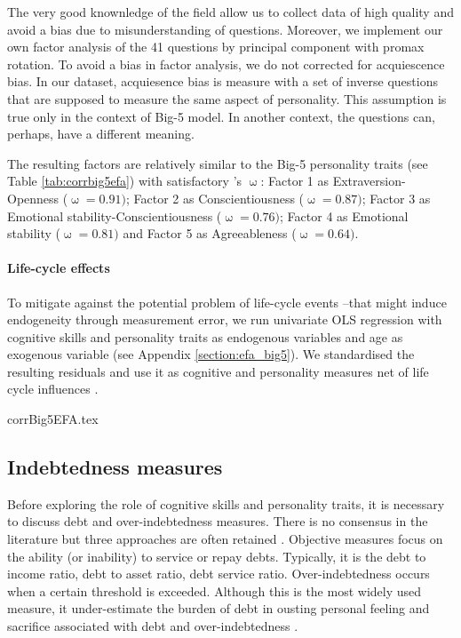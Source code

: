 \documentclass[a4paper, 11pt, onecolumn]{article}
\begin{document}
The very good knownledge of the field allow us to collect data of high quality and avoid a bias due to misunderstanding of questions.
Moreover, we implement our own factor analysis of the 41 questions by principal component with promax rotation.
To avoid a bias in factor analysis, we do not corrected for acquiescence bias.
In our dataset, acquiesence bias is measure with a set of inverse questions that are supposed to measure the same aspect of personality. 
This assumption is true only in the context of Big-5 model. 
In another context, the questions can, perhaps, have a different meaning.

The resulting factors are relatively similar to the Big-5 personality traits (see Table \ref{tab:corrbig5efa}) with satisfactory \citeauthor{McDonald1999}'s $\upomega$: Factor 1 as Extraversion-Openness ($\upomega=0.91)$; Factor 2 as Conscientiousness ($\upomega=0.87)$; Factor 3 as Emotional stability-Conscientiousness ($\upomega=0.76)$; Factor 4 as Emotional stability ($\upomega=0.81)$ and Factor 5 as Agreeableness ($\upomega=0.64)$.

\paragraph{Life-cycle effects}
To mitigate against the potential problem of life-cycle events --that might induce endogeneity through measurement error, we run univariate OLS regression with cognitive skills and personality traits as endogenous variables and age as exogenous variable (see Appendix \ref{section:efa_big5}).
We standardised the resulting residuals and use it as cognitive and personality measures net of life cycle influences \citep{Nyhus2005, Brown2014}. 



{corrBig5EFA.tex}



	\subsection{Indebtedness measures}

Before exploring the role of cognitive skills and personality traits, it is necessary to discuss debt and over-indebtedness measures.
There is no consensus in the literature but three approaches are often retained \citep{Betti2007, Ferreira2000}.
Objective measures focus on the ability (or inability) to service or repay debts.
Typically, it is the debt to income ratio, debt to asset ratio, debt service ratio.
Over-indebtedness occurs when a certain threshold is exceeded.
Although this is the most widely used measure, it under-estimate the burden of debt in ousting personal feeling and sacrifice associated with debt and over-indebtedness \citep{Betti2007}.
 
\end{document}
